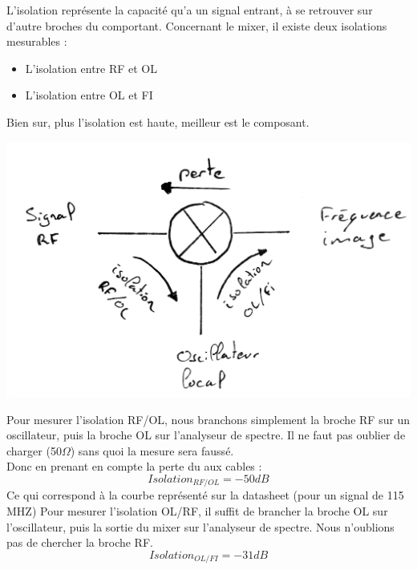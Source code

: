 \documentclass[a4paper,12pt]{report}            %
\begin{document}
    L'isolation représente la capacité qu'a un signal entrant, à se retrouver sur d'autre
broches du comportant. Concernant le mixer, il existe deux isolations mesurables : 
\begin{itemize}
    \item L'isolation entre RF et OL
    \item L'isolation entre OL et FI
\end{itemize}
Bien sur, plus l'isolation est haute, meilleur est le composant.
\begin{center}\includegraphics[scale = 0.3]{pic/isolation.png}\\ \end{center}

    Pour mesurer l'isolation RF/OL, nous branchons simplement la broche RF sur un oscillateur, 
puis la broche OL sur l'analyseur de spectre. Il ne faut pas oublier de charger (50$\Omega$) sans
quoi la mesure sera faussé.\\
Donc en prenant en compte la perte du aux cables :\\
$$Isolation_{RF/OL} = -50dB$$
Ce qui correspond à la courbe représenté sur la datasheet (pour un signal de 115 MHZ)
    Pour mesurer l'isolation OL/RF, il suffit de brancher la broche OL sur l'oscillateur, 
puis la sortie du mixer sur l'analyseur de spectre. Nous n'oublions pas de chercher la
broche RF.
$$Isolation_{OL/FI} = -31dB$$
\end{document}
